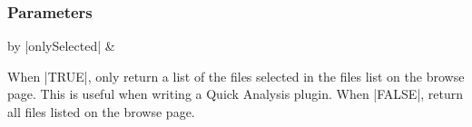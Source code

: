 \documentclass{report}
\begin{document}
\subsubsection{Parameters}
\begin{table}[h]
\begin{center}
\begin{tabular}{by}
		|onlySelected| & \begin{minipage}[t]{0.8\columnwidth}When |TRUE|, only return a list of the files selected in the files list on the browse page. This is useful when writing a Quick Analysis plugin. When |FALSE|, return all files listed on the browse page.\end{minipage}\\
	\end{tabular}
\end{center}
\end{table}
\end{document}
